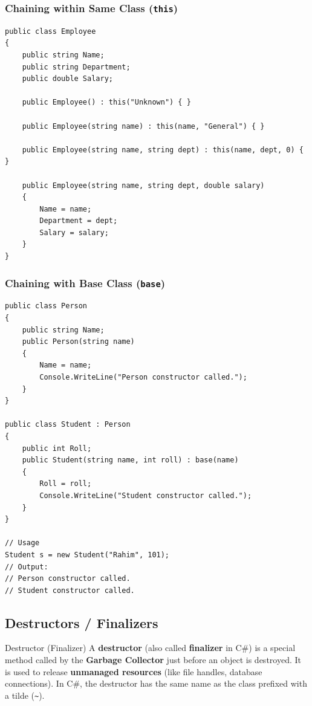 \documentclass[11pt,a4paper]{article}
\begin{document}
\subsubsection{Chaining within Same Class (\texttt{this})}

\begin{lstlisting}[caption={Constructor chaining using this()}]
public class Employee
{
    public string Name;
    public string Department;
    public double Salary;

    public Employee() : this("Unknown") { }

    public Employee(string name) : this(name, "General") { }

    public Employee(string name, string dept) : this(name, dept, 0) { }

    public Employee(string name, string dept, double salary)
    {
        Name = name;
        Department = dept;
        Salary = salary;
    }
}
\end{lstlisting}

\subsubsection{Chaining with Base Class (\texttt{base})}

\begin{lstlisting}[caption={Constructor chaining using base()}]
public class Person
{
    public string Name;
    public Person(string name)
    {
        Name = name;
        Console.WriteLine("Person constructor called.");
    }
}

public class Student : Person
{
    public int Roll;
    public Student(string name, int roll) : base(name)
    {
        Roll = roll;
        Console.WriteLine("Student constructor called.");
    }
}

// Usage
Student s = new Student("Rahim", 101);
// Output:
// Person constructor called.
// Student constructor called.
\end{lstlisting}

\subsection{Destructors / Finalizers}

\begin{defnBox}{Destructor (Finalizer)}
A \textbf{destructor} (also called \textbf{finalizer} in C\#) is a special method called by the \textbf{Garbage Collector} just before an object is destroyed. It is used to release \textbf{unmanaged resources} (like file handles, database connections). In C\#, the destructor has the same name as the class prefixed with a tilde (\texttt{\textasciitilde}).
\end{defnBox}
\end{document}
